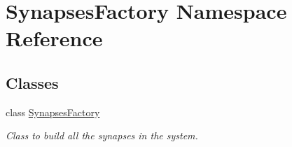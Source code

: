 \hypertarget{namespace_synapses_factory}{}\section{Synapses\+Factory Namespace Reference}
\label{namespace_synapses_factory}
\subsection*{Classes}
\begin{DoxyCompactItemize}
\item 
class \hyperlink{class_synapses_factory_1_1_synapses_factory}{Synapses\+Factory}
\begin{DoxyCompactList}\small\item\em Class to build all the synapses in the system. \end{DoxyCompactList}\end{DoxyCompactItemize}

